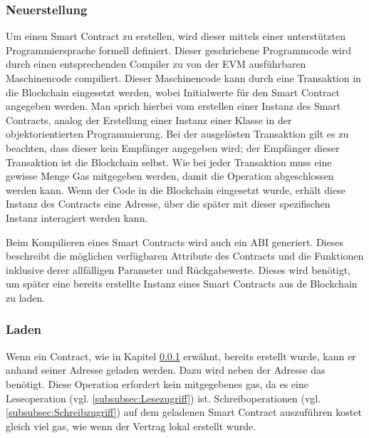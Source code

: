 \subsubsection{Neuerstellung}
\label{subsubsec:Neuerstellung}
Um einen Smart Contract zu erstellen, wird dieser mittels einer unterstützten Programmiersprache formell definiert. Dieser geschriebene Programmcode wird durch einen entsprechenden Compiler zu von der EVM ausführbaren Maschinencode compiliert. Dieser Maschinencode kann durch eine Transaktion in die Blockchain eingesetzt werden, wobei Initialwerte für den Smart Contract angegeben werden. Man sprich hierbei vom erstellen einer Instanz des Smart Contracts, analog der Erstellung einer Instanz einer Klasse in der objektorientierten Programmierung. Bei der ausgelösten Transaktion gilt es zu beachten, dass dieser kein Empfänger angegeben wird; der Empfänger dieser Transaktion ist die Blockchain selbst. Wie bei jeder Transaktion muss eine gewisse Menge Gas mitgegeben werden, damit die Operation abgeschlossen werden kann. Wenn der Code in die Blockchain eingesetzt wurde, erhält diese Instanz des Contracts eine Adresse, über die später mit dieser spezifischen Instanz interagiert werden kann.\cite[Solidity in Depth/Contracts/Creating Contracts]{solidity.readthedocs.io}

Beim Kompilieren eines Smart Contracts wird auch ein \acrfull{ABI} generiert. Dieses beschreibt die möglichen verfügbaren Attribute des Contracts und die Funktionen inklusive derer allfälligen Parameter und Rückgabewerte. Dieses wird benötigt, um später eine bereits erstellte Instanz eines Smart Contracts aus de Blockchain zu laden. \cite{media.consensys.net/events-and-logs}

\subsubsection{Laden}
Wenn ein Contract, wie in Kapitel \ref{subsubsec:Neuerstellung} erwähnt, bereits erstellt wurde, kann er anhand seiner Adresse geladen werden.\cite[Solidity in Depth/Contracts/Creating Contracts]{solidity.readthedocs.io} Dazu wird neben der Adresse das  benötigt. Diese Operation erfordert kein mitgegebenes gas, da es eine Leseoperation (vgl. \ref{subsubsec:Lesezugriff}) ist. Schreiboperationen (vgl. \ref{subsubsec:Schreibzugriff}) auf dem geladenen Smart Contract auszuführen kostet gleich viel gas, wie wenn der Vertrag lokal erstellt wurde.

